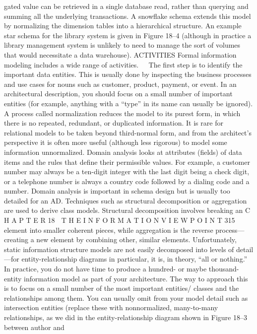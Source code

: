gated value can be retrieved in a single database read, rather than querying
and summing all the underlying transactions. A snowflake schema extends
this model by normalizing the dimension tables into a hierarchical structure.
An example star schema for the library system is given in Figure 18–4
(although in practice a library management system is unlikely to need to
manage the sort of volumes that would necessitate a data warehouse).
ACTIVITIES Formal information modeling includes a wide range of activities.
The first step is to identify the important data entities. This is usually
done by inspecting the business processes and use cases for nouns such
as customer, product, payment, or event. In an architectural description,
you should focus on a small number of important entities (for example,
anything with a “type” in its name can usually be ignored).
A process called normalization reduces the model to its purest form, in
which there is no repeated, redundant, or duplicated information. It is
rare for relational models to be taken beyond third-normal form, and
from the architect’s perspective it is often more useful (although less
rigorous) to model some information unnormalized.
Domain analysis looks at attributes (fields) of data items and the rules
that define their permissible values. For example, a customer number
may always be a ten-digit integer with the last digit being a check digit,
or a telephone number is always a country code followed by a dialing
code and a number. Domain analysis is important in schema design but
is usually too detailed for an AD.
Techniques such as structural decomposition or aggregation are used to
derive class models. Structural decomposition involves breaking an
C H A P T E R 18  T H E I N F O R M A T I O N V I E W P O I N T
 315
element into smaller coherent pieces, while aggregation is the reverse
process—creating a new element by combining other, similar elements.
Unfortunately, static information structure models are not easily decomposed
into levels of detail—for entity-relationship diagrams in particular, it is, in theory,
“all or nothing.” In practice, you do not have time to produce a hundred- or
maybe thousand-entity information model as part of your architecture. The way
to approach this is to focus on a small number of the most important entities/
classes and the relationships among them.
You can usually omit from your model detail such as intersection entities
(replace these with nonnormalized, many-to-many relationships, as we did in
the entity-relationship diagram shown in Figure 18–3 between author and
